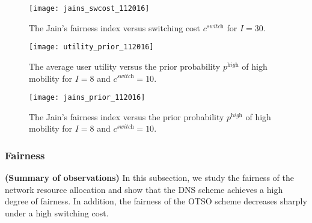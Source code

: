 \documentclass[journal]{IEEEtran}
\begin{document}
\begin{figure*}[t]
\hspace{-0.5cm}
\centering
%
\begin{minipage}[t]{0.3\linewidth}
       \texttt{[image: jains\_swcost\_112016]} %
   \caption{The Jain's fairness index versus switching cost $c^{\textit{switch}}$ for $I = 30$.} 
   \label{fig:jains_swcost}
\end{minipage}
%
\quad
%
\begin{minipage}[t]{0.3\linewidth}
       \texttt{[image: utility\_prior\_112016]} %
 \caption{The average user utility versus the prior probability $p^{\textit{high}}$ of high mobility for $I = 8$ and $c^{\textit{switch}} = 10$.}
\label{fig:utility_prior}
\end{minipage}
%
\quad
%
\begin{minipage}[t]{0.3\linewidth}
       \texttt{[image: jains\_prior\_112016]} %
 \caption{The Jain's fairness index versus the prior probability $p^{\textit{high}}$ of high mobility for $I = 8$ and $c^{\textit{switch}} = 10$.}
\label{fig:jains_prior}
\end{minipage}
%
\vspace{-0.2cm}
\end{figure*}




\subsubsection{Fairness} 

  \textbf{(Summary of observations)} In this subsection, we study the fairness of the network resource allocation and show that the DNS scheme achieves a high degree of fairness. In addition, the fairness of the OTSO scheme decreases sharply under a high switching cost.
\end{document}
